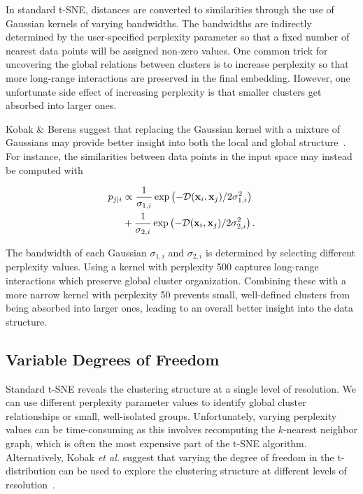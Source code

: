 \documentclass[twocolumn]{bmcart}
\begin{document}
In standard t-SNE, distances are converted to similarities through the use of
Gaussian kernels of varying bandwidths. The bandwidths are indirectly determined
by the user-specified perplexity parameter so that a fixed number of nearest
data points will be assigned non-zero values. One common trick for uncovering
the global relations between clusters is to increase perplexity so that more
long-range interactions are preserved in the final embedding.  However, one
unfortunate side effect of increasing perplexity is that smaller clusters get
absorbed into larger ones.

Kobak \& Berens suggest that replacing the Gaussian kernel with a mixture of
Gaussians may provide better insight into both the local and global
structure~\cite{kobak2019art}. For instance, the similarities between data
points in the input space may instead be computed with

\begin{align}
  p_{j\mid i} &\propto \frac{1}{\sigma_{1,i}} \exp \left ( -\mathcal{D}(\mathbf{x}_i, \mathbf{x}_j ) / 2\sigma_{1,i}^2 \right ) \notag \\
  &+ \frac{1}{\sigma_{2,i}} \exp \left ( -\mathcal{D}(\mathbf{x}_i, \mathbf{x}_j ) / 2\sigma_{2,i}^2 \right ).
\end{align}

The bandwidth of each Gaussian $\sigma_{1,i}$ and $\sigma_{2,i}$ is determined
by selecting different perplexity values. Using a kernel with perplexity 500
captures long-range interactions which preserve global cluster organization.
Combining these with a more narrow kernel with perplexity 50 prevents small,
well-defined clusters from being absorbed into larger ones, leading to an overall better
insight into the data structure.

\subsection*{Variable Degrees of Freedom}

Standard t-SNE reveals the clustering structure at a single level of resolution.
We can use different perplexity parameter values to identify global cluster
relationships or small, well-isolated groups. Unfortunately, varying perplexity
values can be time-consuming as this involves recomputing the $k$-nearest neighbor graph, which is often the most expensive part of the t-SNE algorithm.
Alternatively, Kobak \textit{et al.} suggest that varying the degree of freedom
in the t-distribution can be used to explore the clustering structure at
different levels of resolution~\cite{kobak2019heavy}. 
\end{document}
